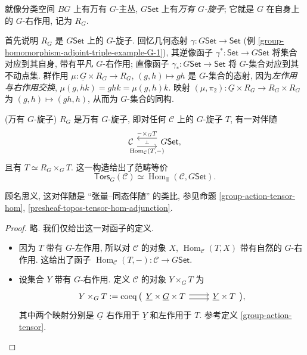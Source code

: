 就像分类空间 $BG$ 上有万有 $G$-主丛, \topos{} $G\mathsf {Set}$ 上有\emph{万有 $G$-旋子}; 它就是 $G$ 在自身上的 $G$-右作用, 记为 $R_G$.

首先说明 $R_G$ 是 $G\mathsf {Set}$ 上的 $G$-旋子.
回忆几何态射 $\gamma\colon G\mathsf {Set} \to \mathsf {Set}$ (例 \ref{group-homomorphism-adjoint-triple-example-G-1}), 其逆像函子 $\gamma^*\colon \mathsf {Set} \to G\mathsf {Set}$ 将集合对应到其自身, 带有平凡 $G$-右作用; 直像函子 $\gamma_*\colon G\mathsf {Set}\to\mathsf {Set}$ 将 $G$-集合对应到其不动点集.
群作用 $\mu\colon \underline G\times R_G \to R_G$, $(g,h)\mapsto gh$ 是 $G$-集合的态射, 因为\emph{左作用与右作用交换},  $\mu(g,hk)=ghk=\mu(g,h)k$.
映射 $(\mu,\pi_2)\colon \underline G\times R_G\to R_G\times R_G$ 为 $(g,h)\mapsto (gh,h)$, 从而为 $G$-集合的同构.

\begin{prop}
	{(万有 $G$-旋子)}
	$R_G$ 是万有 $G$-旋子, 即对任何\topos{} $\mathcal C$ 上的 $G$-旋子 $T$, 有一对伴随
	\[\begin{tikzcd}[ampersand replacement=\&]
		{\mathcal C} \& {G\mathsf {Set},}
		\arrow[""{name=0, anchor=center, inner sep=0}, "{\operatorname{Hom}_{\mathcal C}(T,-)}"', shift right=2, from=1-1, to=1-2]
		\arrow[""{name=1, anchor=center, inner sep=0}, "{-\times_{G}T}"', shift right=2, from=1-2, to=1-1]
		\arrow["\dashv"{anchor=center, rotate=-90}, draw=none, from=1, to=0]
	\end{tikzcd}\]
	且有 $T\simeq R_G\times_G T$. 这一构造给出了范畴等价
	\[
	\mathsf{Tors}_G(\mathcal C)\simeq\operatorname{Hom}_{\Top}(\mathcal C,G\mathsf {Set}).
	\]
\end{prop}
顾名思义, 这对伴随是 ``张量--同态伴随'' 的类比, 参见命题 \ref{group-action-tensor-hom}, \ref{presheaf-topos-tensor-hom-adjunction}.
\begin{proof} 略. 我们仅给出这一对函子的定义.
\begin{itemize}
	\item 因为 $T$ 带有 $G$-左作用, 所以对 $\mathcal C$ 的对象 $X$, $\operatorname{Hom}_{\mathcal C}(T,X)$ 带有自然的 $G$-右作用. 这给出了函子 $\operatorname{Hom}_{\mathcal C}(T,-)\colon \mathcal C\to G\mathsf {Set}$.
	\item 设集合 $Y$ 带有 $G$-右作用. 定义 $\mathcal C$ 的对象 $Y\times_G T$ 为
	\[
	Y\times_G T := \operatorname{coeq}\big(
		\begin{tikzcd}[ampersand replacement=\&]
			{\underline Y\times \underline G \times T} \& {\underline Y\times T}
			\arrow[shift left, from=1-1, to=1-2]
			\arrow[shift right, from=1-1, to=1-2]
		\end{tikzcd}
	\big),
	\]
	其中两个映射分别是 $\underline G$ 右作用于 $\underline Y$ 和左作用于 $T$. 参考定义 \ref{group-action-tensor}.
\end{itemize}
\end{proof}



